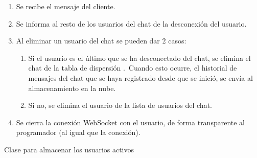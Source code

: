 \begin{enumerate}
	\item Se recibe el mensaje  del cliente.
	\item Se informa al resto de los usuarios del chat de la desconexión del usuario.
	\item Al eliminar un usuario del chat se pueden dar 2 casos:
	\begin{enumerate}
		\item Si el usuario es el último que se ha desconectado del chat, se elimina el chat de la tabla de dispersión
		.\ Cuando esto ocurre, el historial de mensajes del chat que se haya registrado desde que se
		inició, se envía al almacenamiento en la nube.
		\item Si no, se elimina el usuario de la lista de usuarios del chat.
	\end{enumerate}
	\item Se cierra la conexión WebSocket con el usuario, de forma transparente al programador (al igual que la
	conexión).
\end{enumerate}

\begin{umlDiagram}
	\centering


	\caption{Clase  para almacenar los usuarios activos}
	\label{diagram-WebSocketChatMapClass}
\end{umlDiagram}
